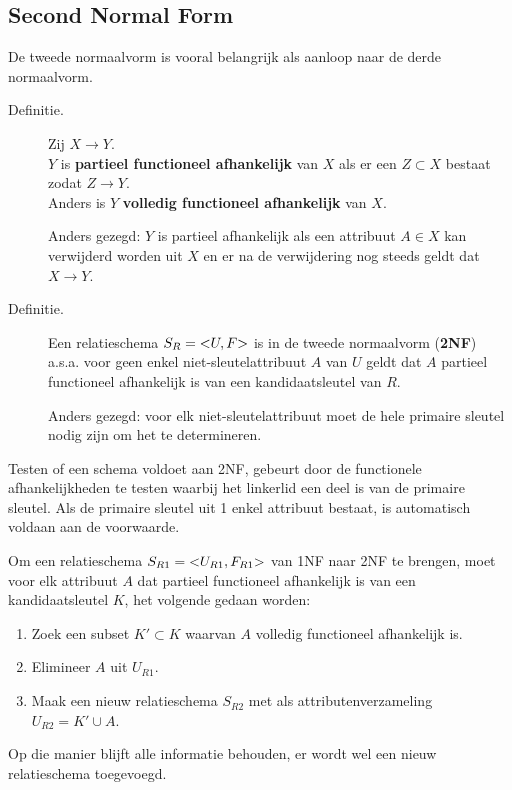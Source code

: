 \subsection{Second Normal Form}
De tweede normaalvorm is vooral belangrijk als aanloop naar de derde normaalvorm.
\begin{description}
	\item[Definitie.] Zij $X \rightarrow Y$.\\
	$Y$ is \textbf{partieel functioneel afhankelijk} van $X$ als er een $Z \subset X$ bestaat zodat $Z \rightarrow Y$.\\
	Anders is $Y$ \textbf{volledig functioneel afhankelijk} van $X$.

	Anders gezegd: $Y$ is partieel afhankelijk als een attribuut $A \in X$ kan verwijderd worden uit $X$ en er na de verwijdering nog steeds geldt dat $X \rightarrow Y$.

	\item[Definitie.] Een relatieschema $S_R = \text{\textless} U,F \text{\textgreater}$ is in de tweede normaalvorm (\textbf{2NF}) a.s.a. voor geen enkel niet-sleutelattribuut $A$ van $U$ geldt dat $A$ partieel functioneel afhankelijk is van een kandidaatsleutel van $R$.

	Anders gezegd: voor elk niet-sleutelattribuut moet de hele primaire sleutel nodig zijn om het te determineren.
\end{description}
Testen of een schema voldoet aan 2NF, gebeurt door de functionele afhankelijkheden te testen waarbij het linkerlid een deel is van de primaire sleutel. Als de primaire sleutel uit 1 enkel attribuut bestaat, is automatisch voldaan aan de voorwaarde.

Om een relatieschema $S_{R1} = \text{\textless} U_{R1}, F_{R1} \text{\textgreater}$ van 1NF naar 2NF te brengen, moet voor elk attribuut $A$ dat partieel functioneel afhankelijk is van een kandidaatsleutel $K$, het volgende gedaan worden:
\begin{enumerate}
	\item Zoek een subset $K' \subset K$ waarvan $A$ volledig functioneel afhankelijk is.
	\item Elimineer $A$ uit $U_{R1}$.
	\item Maak een nieuw relatieschema $S_{R2}$ met als attributenverzameling $U_{R2} = K' \cup A$.
\end{enumerate}
Op die manier blijft alle informatie behouden, er wordt wel een nieuw relatieschema toegevoegd.



